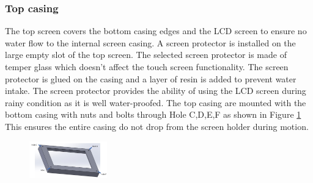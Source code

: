 \documentclass[11pt,landscape]{article}
\begin{document}
\begin{multicols}{3}
    \subsubsection{Top casing}
    The top screen covers the bottom casing edges and the LCD screen to ensure
    no water flow to the internal screen casing. A screen protector is installed
    on the large empty slot of the top screen. The selected screen protector is
    made of temper glass which doesn’t affect the touch screen functionality.
    The screen protector is glued on the casing and a layer of resin is added to
    prevent water intake. The screen protector provides the ability of using the
    LCD screen during rainy condition as it is well water-proofed. The top
    casing are mounted with the bottom casing with nuts and bolts through Hole
    C,D,E,F as shown in Figure \ref{fig:HOLE} This ensures the entire casing do
    not drop from the screen holder during motion.
    
    \begin{figure}[H]
        \begin{center}
            \includegraphics[width=0.3\textwidth]{Figure13.jpg}
            \label{fig:HOLE}
        \end{center}
    \end{figure}
\end{multicols}
\end{document}
